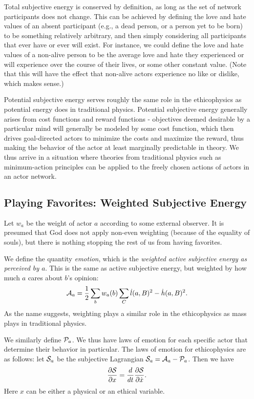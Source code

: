 \documentclass{article}
\begin{document}
Total subjective energy is conserved by definition, as long as the set
of network participants does not change. This can be achieved by
defining the love and hate values of an absent participant (e.g., a
dead person, or a person yet to be born) to be something relatively
arbitrary, and then simply considering all participants that ever have
or ever will exist. For instance, we could define the love and hate
values of a non-alive person to be the average love and hate they
experienced or will experience over the course of their lives, or some
other constant value. (Note that this will have the effect that
non-alive actors experience no like or dislike, which makes sense.)

Potential subjective energy serves roughly the same role in the
ethicophysics as potential energy does in traditional
physics. Potential subjective energy generally arises from cost
functions and reward functions - objectives deemed desirable by a
particular mind will generally be modeled by some cost function, which
then drives goal-directed actors to minimize the costs and maximize
the reward, thus making the behavior of the actor at least marginally
predictable in theory. We thus arrive in a situation where theories
from traditional physics such as minimum-action principles can be
applied to the freely chosen actions of actors in an actor network.

\subsection{Playing Favorites: Weighted Subjective Energy}

Let $w_a$ be the weight of actor $a$ according to some external
observer. It is presumed that God does not apply non-even weighting
(because of the equality of souls), but there is nothing stopping the
rest of us from having favorites.

We define the quantity {\em emotion}, which is the {\em weighted
  active subjective energy as perceived by $a$}. This is the same as
active subjective energy, but weighted by how much $a$ cares about
$b$'s opinion:
$${\mathcal A}_a = \frac{1}{2} \sum_{b} w_a(b) \sum_{C} \dot{l}(a, B)^2 - \dot{h}(a, B)^2.$$ 
As the name suggests, weighting plays a similar role in the
ethicophysics as mass plays in traditional physics. 

We similarly define ${\mathcal P}_a$. We thus have laws of emotion for each
specific actor that determine their behavior in particular. The laws
of emotion for ethicophysics are as follows: let ${\mathcal S}_a$ be the
subjective Lagrangian ${\mathcal S}_a = {\mathcal A}_a - {\mathcal P}_a$. Then we have
$$\frac{\partial {\mathcal S}}{\partial x} = \frac{d}{dt} \frac{\partial
  {\mathcal S}}{\partial \dot{x}}.$$
Here $x$ can be either a physical or an ethical variable.
\end{document}
